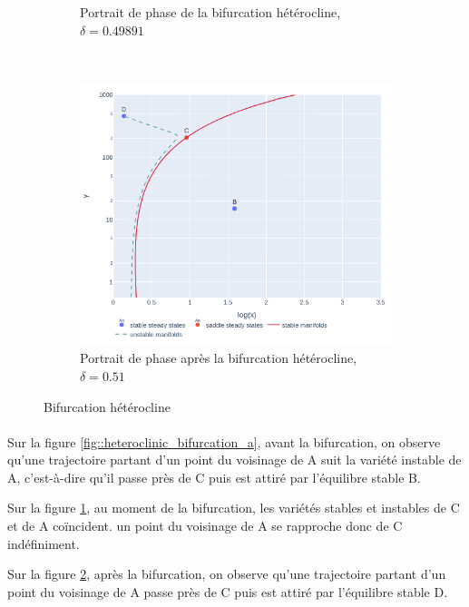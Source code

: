 \documentclass[12pt]{article}
\begin{document}
\begin{figure}[!ht]
\begin{subfigure}[b]{0.4\textwidth}
         \caption{Portrait de phase de la bifurcation hétérocline, $\delta = 0.49891$}
         \label{fig::heteroclinic_bifurcation_b}
     \end{subfigure}\\
     \begin{subfigure}[b]{0.4\textwidth}
         \centering
         \includegraphics[width=\textwidth]{figures/fig_heteroclinic_after.png}
         \caption{Portrait de phase après la bifurcation hétérocline, $\delta = 0.51$}
         \label{fig::heteroclinic_bifurcation_c}
     \end{subfigure}
    \caption{Bifurcation hétérocline}
    \label{fig::heteroclinic_bifurcation}
\end{figure}
\paragraph{}
Sur la figure \ref{fig::heteroclinic_bifurcation_a}, avant la bifurcation, on observe qu'une trajectoire partant d'un point du voisinage de A suit la variété instable de A, c'est-à-dire qu'il passe près de C  puis est attiré par l'équilibre stable B.

Sur la figure \ref{fig::heteroclinic_bifurcation_b}, au moment de la bifurcation, les variétés stables et instables de C et de A coïncident. un point du voisinage de A se rapproche donc de C indéfiniment. 

Sur la figure \ref{fig::heteroclinic_bifurcation_c}, après la bifurcation, on observe qu'une trajectoire partant d'un point du voisinage de A passe près de C  puis est attiré par l'équilibre stable D.
\end{document}
